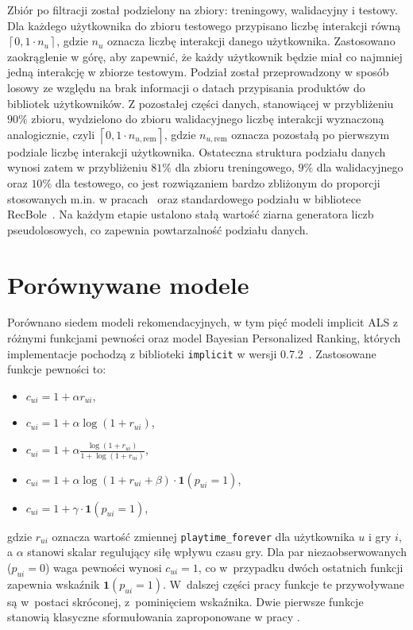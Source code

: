 Zbiór po filtracji został podzielony na zbiory: treningowy, walidacyjny i testowy. Dla każdego użytkownika do zbioru testowego przypisano liczbę interakcji równą
$\left\lceil 0{,}1 \cdot n_u \right\rceil$,
gdzie $n_u$ oznacza liczbę interakcji danego użytkownika. Zastosowano zaokrąglenie w górę, aby zapewnić, że każdy użytkownik będzie miał co najmniej jedną interakcję w zbiorze testowym. Podział został przeprowadzony w sposób losowy ze względu na brak informacji o datach przypisania produktów do bibliotek użytkowników. Z pozostałej części danych, stanowiącej w przybliżeniu $90\%$ zbioru, wydzielono do zbioru walidacyjnego liczbę interakcji wyznaczoną analogicznie, czyli $\left\lceil 0{,}1 \cdot n_{u,\text{rem}} \right\rceil$, gdzie $n_{u,\text{rem}}$ oznacza pozostałą po pierwszym podziale liczbę interakcji użytkownika. Ostateczna struktura podziału danych wynosi zatem w przybliżeniu $81\%$ dla zbioru treningowego, $9\%$ dla walidacyjnego oraz $10\%$ dla testowego, co jest rozwiązaniem bardzo zbliżonym do proporcji stosowanych m.in. w pracach~\cite{wang2019neural, moscati2026networked} oraz standardowego podziału w bibliotece RecBole~\cite{recbole}. Na każdym etapie ustalono stałą wartość ziarna generatora liczb pseudolosowych, co zapewnia powtarzalność podziału danych.

\section{Porównywane modele}
\label{sec:porownywane-modele}

Porównano siedem modeli rekomendacyjnych, w tym pięć modeli implicit ALS z różnymi funkcjami pewności oraz model Bayesian Personalized Ranking, których implementacje pochodzą z biblioteki \texttt{implicit} w wersji 0.7.2~\cite{frederickson2022implicit}. Zastosowane funkcje pewności to:
\begin{itemize}
    \item $c_{ui} = 1 + \alpha r_{ui}$,
    \item $c_{ui} = 1 + \alpha \log(1 + r_{ui})$,
    \item $c_{ui} = 1 + \alpha \frac{\log(1 + r_{ui})}{1 + \log(1 + r_{ui})}$,
    \item $c_{ui} = 1 + \alpha \log(1 + r_{ui} + \beta) \cdot \mathbf{1}(p_{ui} = 1)$,
    \item $c_{ui} = 1 + \gamma \cdot \mathbf{1}(p_{ui} = 1)$,
\end{itemize}
gdzie $r_{ui}$ oznacza wartość zmiennej \texttt{playtime\_forever} dla użytkownika $u$ i gry $i$, a $\alpha$ stanowi skalar regulujący siłę wpływu czasu gry. Dla par niezaobserwowanych ($p_{ui} = 0$) waga pewności wynosi $c_{ui} = 1$, co w~przypadku dwóch ostatnich funkcji zapewnia wskaźnik $\mathbf{1}(p_{ui}=1)$. W~dalszej części pracy funkcje te przywoływane są w~postaci skróconej, z~pominięciem wskaźnika. Dwie pierwsze funkcje stanowią klasyczne sformułowania zaproponowane w pracy \cite{hu2008implicit}. 

